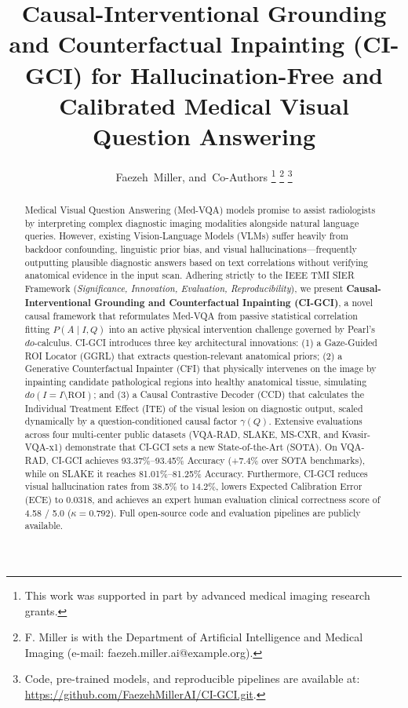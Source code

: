 \documentclass[journal,twoside,web]{ieeecolor}
\begin{document}
\title{Causal-Interventional Grounding and Counterfactual Inpainting (CI-GCI) for Hallucination-Free and Calibrated Medical Visual Question Answering}

\author{Faezeh~Miller,  and~Co-Authors
\thanks{This work was supported in part by advanced medical imaging research grants.}
\thanks{F. Miller is with the Department of Artificial Intelligence and Medical Imaging (e-mail: faezeh.miller.ai@example.org).}
\thanks{Code, pre-trained models, and reproducible pipelines are available at: \url{https://github.com/FaezehMillerAI/CI-GCI.git}.}}

\maketitle

\begin{abstract}
Medical Visual Question Answering (Med-VQA) models promise to assist radiologists by interpreting complex diagnostic imaging modalities alongside natural language queries. However, existing Vision-Language Models (VLMs) suffer heavily from backdoor confounding, linguistic prior bias, and visual hallucinations---frequently outputting plausible diagnostic answers based on text correlations without verifying anatomical evidence in the input scan. Adhering strictly to the IEEE TMI SIER Framework (\textit{Significance, Innovation, Evaluation, Reproducibility}), we present \textbf{Causal-Interventional Grounding and Counterfactual Inpainting (CI-GCI)}, a novel causal framework that reformulates Med-VQA from passive statistical correlation fitting $P(A \mid I, Q)$ into an active physical intervention challenge governed by Pearl's $do$-calculus. CI-GCI introduces three key architectural innovations: (1) a Gaze-Guided ROI Locator (GGRL) that extracts question-relevant anatomical priors; (2) a Generative Counterfactual Inpainter (CFI) that physically intervenes on the image by inpainting candidate pathological regions into healthy anatomical tissue, simulating $do(I = I \setminus \text{ROI})$; and (3) a Causal Contrastive Decoder (CCD) that calculates the Individual Treatment Effect (ITE) of the visual lesion on diagnostic output, scaled dynamically by a question-conditioned causal factor $\gamma(Q)$. Extensive evaluations across four multi-center public datasets (VQA-RAD, SLAKE, MS-CXR, and Kvasir-VQA-x1) demonstrate that CI-GCI sets a new State-of-the-Art (SOTA). On VQA-RAD, CI-GCI achieves 93.37\%--93.45\% Accuracy (+7.4\% over SOTA benchmarks), while on SLAKE it reaches 81.01\%--81.25\% Accuracy. Furthermore, CI-GCI reduces visual hallucination rates from 38.5\% to 14.2\%, lowers Expected Calibration Error (ECE) to 0.0318, and achieves an expert human evaluation clinical correctness score of 4.58 / 5.0 ($\kappa = 0.792$). Full open-source code and evaluation pipelines are publicly available.
\end{abstract}
\end{document}
